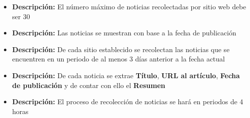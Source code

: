 \documentclass[12pt]{article}
\begin{document}
\begin{itemize}
  \item \textbf{Descripción:} El número máximo de noticias recolectadas por sitio web debe ser 30

\end{itemize}


\begin{itemize}
  \item \textbf{Descripción:} Las noticias se muestran con base a la fecha de publicación
\end{itemize}


\begin{itemize}
  \item \textbf{Descripción:} De cada sitio establecido se recolectan las noticias que se encuentren en un periodo de al menos 3 días anterior a la fecha actual
\end{itemize}


\begin{itemize}
  \item \textbf{Descripción:} De cada noticia se extrae \textbf{Título}, \textbf{URL al artículo}, \textbf{Fecha de publicación} y de contar con ello el \textbf{Resumen}

\end{itemize}



\begin{itemize}
  \item \textbf{Descripción:} El proceso de recolección de noticias se hará en periodos de 4 horas 

\end{itemize}
\end{document}
